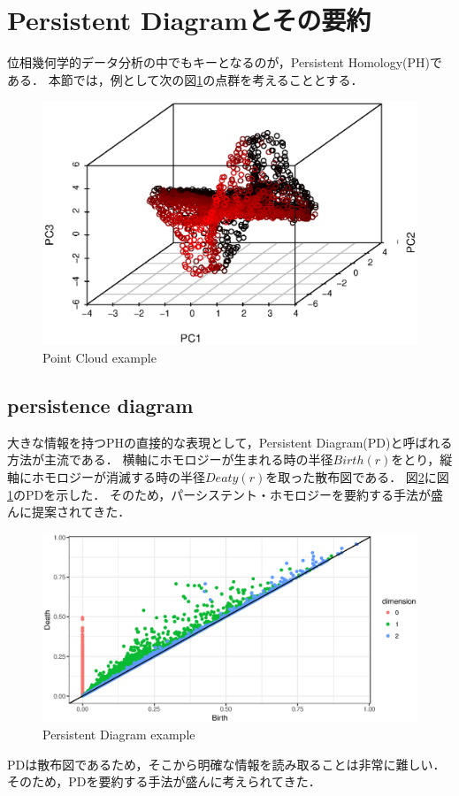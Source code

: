 \documentclass{jarticle}
\begin{document}
\section{Persistent Diagramとその要約}

位相幾何学的データ分析の中でもキーとなるのが，Persistent Homology(PH)である．
本節では，例として次の図\ref{fig:PCex}の点群を考えることとする．
\begin{figure}[H]
	\begin{center}
		\includegraphics[width=15cm]{fig/PC_example.eps}
		\caption{Point Cloud example}
		\label{fig:PCex}
	\end{center}	
\end{figure}


\subsection{persistence diagram}
大きな情報を持つPHの直接的な表現として，Persistent Diagram(PD)と呼ばれる方法が主流である．
横軸にホモロジーが生まれる時の半径$Birth(r)$をとり，縦軸にホモロジーが消滅する時の半径$Deaty(r)$を取った散布図である．
図\ref{fig:PDex}に図\ref{fig:PCex}のPDを示した．
そのため，パーシステント・ホモロジーを要約する手法が盛んに提案されてきた．
\begin{figure}[H]
	\begin{center}
		\includegraphics[width=12cm]{fig/PD_example.eps}
		\caption{Persistent Diagram example}
		\label{fig:PDex}
	\end{center}
\end{figure}
PDは散布図であるため，そこから明確な情報を読み取ることは非常に難しい．
そのため，PDを要約する手法が盛んに考えられてきた．
\end{document}
